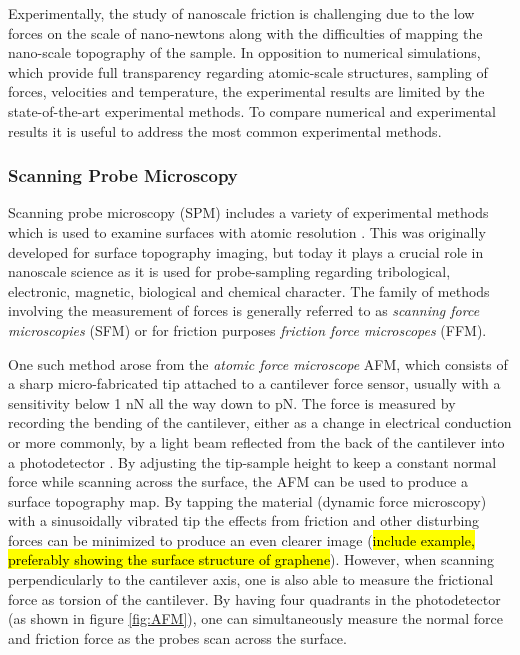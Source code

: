 Experimentally, the study of nanoscale friction is challenging due to the low
forces on the scale of nano-newtons along with the difficulties of mapping the
nano-scale topography of the sample. In opposition to numerical simulations, which provide full
transparency regarding atomic-scale structures, sampling of forces, velocities
and temperature, the experimental results are limited by the state-of-the-art
experimental methods. To compare numerical and experimental results it is useful to address the most common experimental methods.

\subsubsection{Scanning Probe Microscopy}\label{sec:SPM} Scanning probe
microscopy (\acrshort{SPM}) includes a variety of experimental methods which is used to
examine surfaces with atomic resolution \cite[pp. 6-27]{BHUSHAN20051507}. This was
originally developed for surface topography imaging, but today it plays a crucial
role in nanoscale science as it is used for probe-sampling regarding
tribological, electronic, magnetic, biological and chemical character. The
family of methods involving the measurement of forces is generally referred to
as \textit{scanning force microscopies} (\acrshort{SFM}) or for friction purposes
\textit{friction force microscopes} (\acrshort{FFM}).

One such method arose from the \textit{atomic force microscope} \acrshort{AFM}, which consists
of a sharp micro-fabricated tip attached to a cantilever force sensor, usually
with a sensitivity below 1 nN all the way down to pN. The force is measured by recording the bending of
the cantilever, either as a change in electrical conduction or more commonly, by
a light beam reflected from the back of the cantilever into a photodetector
\cite[p. 183]{gnecco_meyer_2015}. By adjusting the tip-sample height to keep a constant
normal force while scanning across the surface, the \acrshort{AFM} can be used to produce a
surface topography map. By tapping the material (dynamic force microscopy) with
a sinusoidally vibrated tip the effects from friction and other disturbing forces
can be minimized to produce an even clearer image (\hl{include example,
preferably showing the surface structure of graphene}). However, when scanning
perpendicularly to the cantilever axis, one is also able to measure the
frictional force as torsion of the cantilever. By having four quadrants in the
photodetector (as shown in figure \cref{fig:AFM}), one can simultaneously
measure the normal force and friction force as the probes scan across the
surface. 

